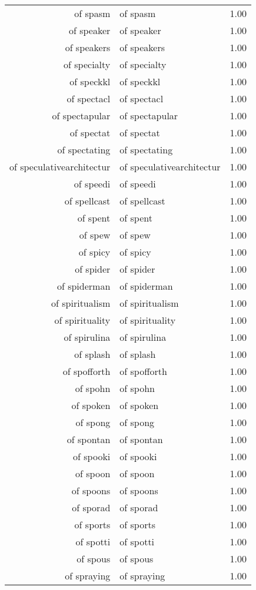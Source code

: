 \begin{table}[ht]
\begin{tabular}{rlr}
  of spasm & of spasm & 1.00 \\ 
  of speaker & of speaker & 1.00 \\ 
  of speakers & of speakers & 1.00 \\ 
  of specialty & of specialty & 1.00 \\ 
  of speckkl & of speckkl & 1.00 \\ 
  of spectacl & of spectacl & 1.00 \\ 
  of spectapular & of spectapular & 1.00 \\ 
  of spectat & of spectat & 1.00 \\ 
  of spectating & of spectating & 1.00 \\ 
  of speculativearchitectur & of speculativearchitectur & 1.00 \\ 
  of speedi & of speedi & 1.00 \\ 
  of spellcast & of spellcast & 1.00 \\ 
  of spent & of spent & 1.00 \\ 
  of spew & of spew & 1.00 \\ 
  of spicy & of spicy & 1.00 \\ 
  of spider & of spider & 1.00 \\ 
  of spiderman & of spiderman & 1.00 \\ 
  of spiritualism & of spiritualism & 1.00 \\ 
  of spirituality & of spirituality & 1.00 \\ 
  of spirulina & of spirulina & 1.00 \\ 
  of splash & of splash & 1.00 \\ 
  of spofforth & of spofforth & 1.00 \\ 
  of spohn & of spohn & 1.00 \\ 
  of spoken & of spoken & 1.00 \\ 
  of spong & of spong & 1.00 \\ 
  of spontan & of spontan & 1.00 \\ 
  of spooki & of spooki & 1.00 \\ 
  of spoon & of spoon & 1.00 \\ 
  of spoons & of spoons & 1.00 \\ 
  of sporad & of sporad & 1.00 \\ 
  of sports & of sports & 1.00 \\ 
  of spotti & of spotti & 1.00 \\ 
  of spous & of spous & 1.00 \\ 
  of spraying & of spraying & 1.00 \\ 

\end{tabular}
\end{table}

